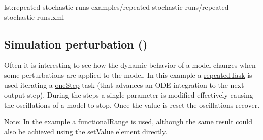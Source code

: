 {lst:repeated-stochastic-runs}
{examples/repeated-stochastic-runs/repeated-stochastic-runs.xml}


\subsection{Simulation perturbation ()}
Often it is interesting to see how the dynamic behavior of a model changes when some perturbations are applied to the model. In this example a \hyperref[class:repeatedTask]{repeatedTask} is used iterating a \hyperref[class:oneStep]{oneStep} task (that advances an ODE integration to the next output step). During the steps a single parameter is modified effectively causing the oscillations of a model to stop. Once the value is reset the oscillations recover. 

Note: In the example a \hyperref[class:functionalRange]{functionalRange} is used, although the same result could also be achieved using the \hyperref[class:setValue]{setValue} element directly.



